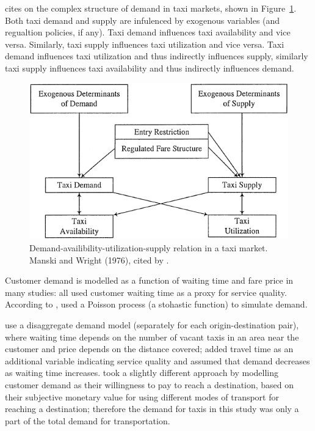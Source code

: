 \textcite{Yang2002taxi+demand} cites \textcite{Manski1967taxi+demand} on the
complex structure of demand in taxi markets, shown in Figure~\ref{figure:taxi}.
Both taxi demand and supply are infulenced by exogenous variables (and
regualtion policies, if any). Taxi demand influences taxi availability and vice
versa. Similarly, taxi supply influences taxi utilization and vice versa. Taxi
demand influences taxi utilization and thus indirectly influences supply,
similarly taxi supply influences taxi availability and thus indirectly
influences demand.

\begin{figure}
  \begin{center}
    \includegraphics{../figures/taxi_demand}
    \caption{
      Demand-availibility-utilization-supply relation in a taxi market. Manski 
      and Wright (1976), cited by \textcite{Yang2002taxi+demand}.
      \label{figure:taxi}
    }
  \end{center}
\end{figure}

Customer demand is modelled as a function of waiting time and fare price in
many studies: \textcite{Douglas1972taxi+regulation, Devany1975taxi+capacity,
Cairns1996taxi+competition, Yang2002taxi+demand} all used customer waiting time
as a proxy for service quality. According to
\textcite{Salanova2011taxi+review}, \textcite{Manski1967taxi+demand} used a
Poisson process (a stohastic function) to simulate demand.

\textcite{Yang2002taxi+demand} use a disaggregate demand model (separately for
each origin-destination pair), where waiting time depends on the number of
vacant taxis in an area near the customer and price depends on the distance
covered; \textcite{Yang2010taxi+nonlinear} added travel time as an additional
variable indicating service quality and assumed that demand decreases as
waiting time increases. \textcite{Yang2010taxi+equilibria} took a slightly
different approach by modelling customer demand as their willingness to pay to
reach a destination, based on their subjective monetary value for using
different modes of transport for reaching a destination; therefore the demand
for taxis in this study was only a part of the total demand for transportation.
